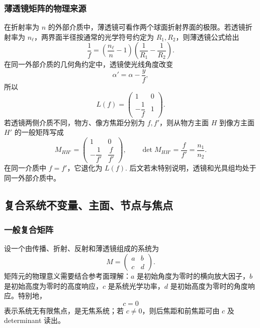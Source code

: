 \subsubsection{薄透镜矩阵的物理来源}

在折射率为 \(n\) 的外部介质中，薄透镜可看作两个球面折射界面的极限。若透镜折射率为 \(n_\ell\)，两界面半径按通常的光学符号约定为 \(R_1,R_2\)，则薄透镜公式给出
\begin{equation}
	\frac{1}{f}
	=\left(\frac{n_\ell}{n}-1\right)
	\left(\frac{1}{R_1}-\frac{1}{R_2}\right).
\end{equation}
在同一外部介质的几何角约定中，透镜使光线角度改变
\begin{equation}
	\alpha'=\alpha-\frac{y}{f},
\end{equation}
所以
\begin{equation}
	L(f)=
	\begin{pmatrix}
		1&0\\[2pt]-\dfrac{1}{f}&1
	\end{pmatrix}.
\end{equation}
若透镜两侧介质不同，物方、像方焦距分别为 \(f,f'\)，则从物方主面 \(H\) 到像方主面 \(H'\) 的一般矩阵写成
\begin{equation}
	M_{HH'}=
	\begin{pmatrix}
		1&0\\[2pt]
		-\dfrac{1}{f'}&\dfrac{f}{f'}
	\end{pmatrix},
\qquad
\det M_{HH'}=\frac{f}{f'}=\frac{n_1}{n_2}.
\end{equation}
在同一介质中 \(f=f'\)，它退化为 \(L(f)\). 后文若未特别说明，透镜和光具组均处于同一外部介质中。

\subsection{复合系统不变量、主面、节点与焦点}

\subsubsection{一般复合矩阵}

设一个由传播、折射、反射和薄透镜组成的系统为
\begin{equation}
	M=
	\begin{pmatrix}
		a&b\\c&d
	\end{pmatrix}.
\end{equation}
矩阵元的物理意义需要结合参考面理解：\(a\) 是初始角度为零时的横向放大因子，\(b\) 是初始高度为零时的高度响应，\(c\) 是系统光学功率，\(d\) 是初始高度为零时的角度响应。特别地，
\begin{equation}
	c=0
\end{equation}
表示系统无有限焦点，是无焦系统；若 \(c\neq0\)，则后焦距和前焦距可由 \(c\) 及 determinant 读出。

